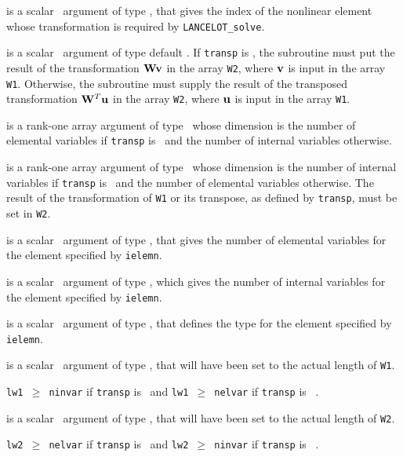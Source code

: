 \documentclass{galahad}
\newcommand{\fullpackagename}{LANC\-E\-LOT}
\newcommand{\solver}{{\tt \fullpackagename\_solve}}
\begin{document}
\begin{description}

 is a scalar \intentin\ argument of type \integer,
that gives the index of the nonlinear element whose transformation is
required by \solver.

 is a scalar \intentin\ argument of type default \logical.
If {\tt transp} is \false, the subroutine must put the result of the
transformation ${\mathbf{W}} {\mathbf{v}}$ in the array {\tt W2}, where ${\mathbf{v}}$ is input in the
array {\tt W1}. Otherwise, the subroutine must supply the result of the
transposed transformation ${\mathbf{W}}^T {\mathbf{u}}$
in the array {\tt W2}, where ${\mathbf{u}}$ is input in the array {\tt W1}.

 is a rank-one \intentin array argument of type \realdp\,
whose dimension is the number of elemental variables
if {\tt transp} is \false\
and the number of internal variables otherwise.

 is a rank-one \intentout array argument of type \realdp\,
whose dimension is
the number of internal variables if {\tt transp} is
\false\ and the number of elemental variables otherwise.
The result of the transformation of {\tt W1} or its transpose, as
defined by {\tt transp}, must be set in {\tt W2}.

 is a scalar \intentin\ argument of type \integer,
that gives the number of elemental variables for the element specified
by {\tt ielemn}.

 is a scalar \intentin\ argument of type \integer,
which gives the number of internal variables for the element specified
by {\tt ielemn}.

 is a scalar \intentin\ argument of type \integer,
that defines the type for the element specified
by {\tt ielemn}.

 is a scalar \intentin\ argument of type \integer,
that will have been set to the actual length of {\tt W1}.

\restriction
{\tt lw1 $\geq$ ninvar} if {\tt transp} is \true\ and
{\tt lw1 $\geq$ nelvar} if {\tt transp} is \false\ .

 is a scalar \intentin\ argument of type \integer,
that will have been set to the actual length of {\tt W2}.

\restriction
{\tt lw2 $\geq$ nelvar} if {\tt transp} is \true\ and
{\tt lw2 $\geq$ ninvar} if {\tt transp} is \false\ .

\end{description}
\end{document}
